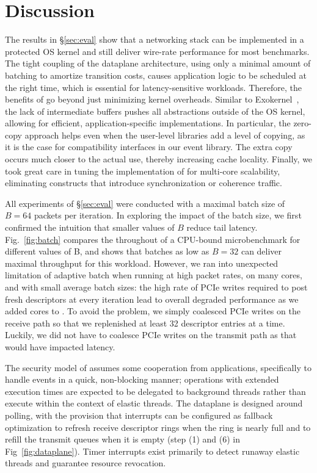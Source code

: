 
\section{Discussion}
\label{sec:disc}


 The results in \S\ref{sec:eval}
show that a networking stack can be implemented in a protected OS
kernel and still deliver wire-rate performance for most benchmarks.
The tight coupling of the dataplane architecture, using only a minimal
amount of batching to amortize transition costs, causes application
logic to be scheduled at the right time, which is essential for
latency-sensitive workloads.  Therefore, the benefits of \ix go beyond
just minimizing kernel overheads. Similar to
Exokernel~\cite{DBLP:conf/sosp/EnglerKO95}, the lack of intermediate
buffers pushes all abstractions outside of the OS kernel, allowing for
efficient, application-specific implementations.  In particular, the
zero-copy approach helps even when the user-level libraries add a
level of copying, as it is the case for compatibility interfaces in
our event library.  The extra copy occurs much closer to the actual
use, thereby increasing cache locality.  Finally, we took great care
in tuning the implementation of \ix for multi-core scalability,
eliminating constructs that introduce synchronization or coherence
traffic.



 All experiments of
\S\ref{sec:eval} were conducted with a maximal batch size of $B=64$
packets per iteration. In exploring the impact of the batch size, we
first confirmed the intuition that smaller values of $B$ reduce tail
latency.  Fig.~\ref{fig:batch} compares the throughout of a CPU-bound
microbenchmark for different values of B, and shows that batches as
low as $B=32$ can deliver maximal throughput for this workload.
However, we ran into unexpected limitation of adaptive batch when
running \ix at high packet rates, on many cores, and with small
average batch sizes: the high rate of PCIe writes required to post
fresh descriptors at every iteration lead to overall degraded
performance as we added cores to \ix.  To avoid the problem, we simply
coalesced PCIe writes on the receive path so that we replenished at
least 32 descriptor entries at a time.  Luckily, we did not have to
coalesce PCIe writes on the transmit path as that would have impacted latency.


The security model of \ix assumes some cooperation from applications,
specifically to handle events in a quick, non-blocking manner;
operations with extended execution times are expected to be delegated
to background threads rather than execute within the context of
elastic threads.  The \ix dataplane is designed around polling, with
the provision that interrupts can be configured as fallback
optimization to refresh receive descriptor rings when the ring is
nearly full and to refill the transmit queues when it is empty (step
(1) and (6) in Fig~\ref{fig:dataplane}).  Timer interrupts exist
primarily to detect runaway elastic threads and guarantee resource
revocation.


